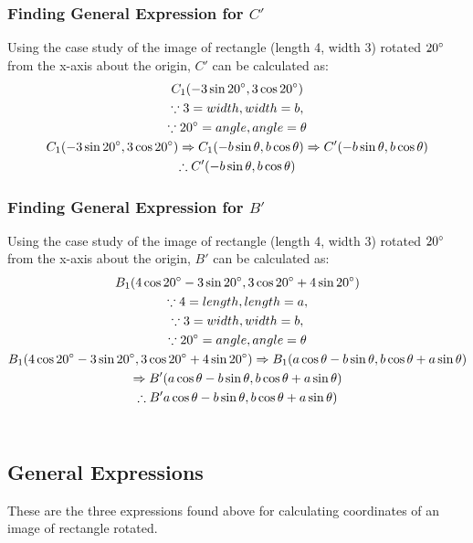 \documentclass{article}
\begin{document}
        \subsubsection{Finding General Expression for $C'$} Using the case study of the image of rectangle (length 4, width 3) rotated $20\degree$ from the x-axis about the origin, $C'$ can be calculated as:
        \begin{gather*}
            C_1(-3\sin{20\degree}, 3\cos{20\degree}) \\
            \because 3 = width, width = b, \\
            \because 20\degree = angle, angle = \theta \\
            C_1(-3\sin{20\degree}, 3\cos{20\degree}) \Rightarrow C_1(-b\sin{\theta}, b\cos{\theta}) \Rightarrow C'(-b\sin{\theta}, b\cos{\theta}) \\
            \therefore C'(-b\sin{\theta}, b\cos{\theta})
        \end{gather*}
        \subsubsection{Finding General Expression for $B'$} Using the case study of the image of rectangle (length 4, width 3) rotated $20\degree$ from the x-axis about the origin, $B'$ can be calculated as:
        \begin{gather*}
            B_1(4\cos{20\degree} -3\sin{20\degree}, 3\cos{20\degree} + 4\sin{20\degree}) \\
            \because 4 = length, length = a, \\
            \because 3 = width, width = b, \\
            \because 20\degree = angle, angle = \theta \\
            B_1(4\cos{20\degree} -3\sin{20\degree}, 3\cos{20\degree} + 4\sin{20\degree}) \Rightarrow B_1(a\cos{\theta} -b\sin{\theta}, b\cos{\theta} + a\sin{\theta}) \\ \Rightarrow B'(a\cos{\theta} -b\sin{\theta}, b\cos{\theta} + a\sin{\theta}) \\
            \therefore B'a\cos{\theta} -b\sin{\theta}, b\cos{\theta} + a\sin{\theta})
        \end{gather*} \\
        \subsection{General Expressions} These are the three expressions found above for calculating coordinates of an image of rectangle rotated.
\end{document}
